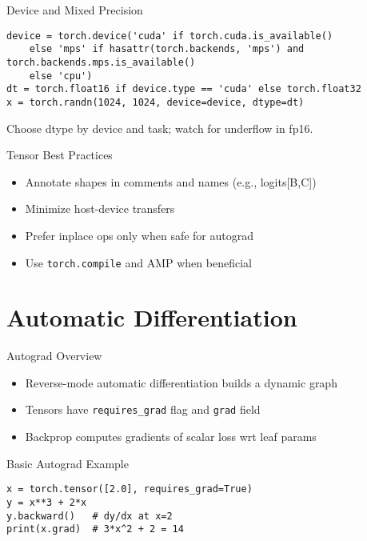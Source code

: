 \documentclass[aspectratio=169,10pt]{beamer}
\begin{document}
\begin{frame}[fragile]{Device and Mixed Precision}
\begin{lstlisting}
device = torch.device('cuda' if torch.cuda.is_available()
    else 'mps' if hasattr(torch.backends, 'mps') and torch.backends.mps.is_available()
    else 'cpu')
dt = torch.float16 if device.type == 'cuda' else torch.float32
x = torch.randn(1024, 1024, device=device, dtype=dt)
\end{lstlisting}
Choose dtype by device and task; watch for underflow in fp16.
\end{frame}

\begin{frame}{Tensor Best Practices}
\begin{itemize}
    \item Annotate shapes in comments and names (e.g., logits[B,C])
    \item Minimize host-device transfers
    \item Prefer inplace ops only when safe for autograd
    \item Use \texttt{torch.compile} and AMP when beneficial
\end{itemize}
\end{frame}

\section{Automatic Differentiation}

\begin{frame}{Autograd Overview}
\begin{itemize}
    \item Reverse-mode automatic differentiation builds a dynamic graph
    \item Tensors have \texttt{requires\_grad} flag and \texttt{grad} field
    \item Backprop computes gradients of scalar loss wrt leaf params
\end{itemize}
\end{frame}

\begin{frame}[fragile]{Basic Autograd Example}
\begin{lstlisting}
x = torch.tensor([2.0], requires_grad=True)
y = x**3 + 2*x
y.backward()   # dy/dx at x=2
print(x.grad)  # 3*x^2 + 2 = 14
\end{lstlisting}
\end{frame}
\end{document}
